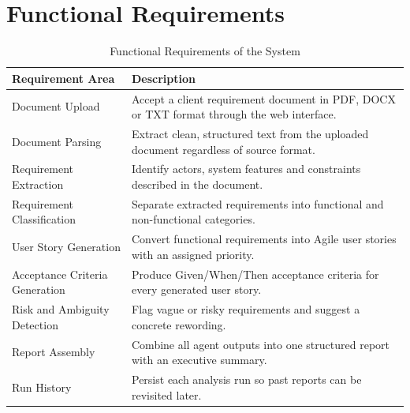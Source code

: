 \documentclass[12pt,a4paper,openany]{report}
\begin{document}
\section{Functional Requirements}
\begin{table}[H]
\centering
\caption{Functional Requirements of the System}
\label{tab:functional}
\begin{tabularx}{\textwidth}{|>{\raggedright\arraybackslash}p{3.6cm}|X|}
\hline
\textbf{Requirement Area} & \textbf{Description} \\
\hline
Document Upload & Accept a client requirement document in PDF, DOCX or TXT format through the web interface. \\
\hline
Document Parsing & Extract clean, structured text from the uploaded document regardless of source format. \\
\hline
Requirement Extraction & Identify actors, system features and constraints described in the document. \\
\hline
Requirement Classification & Separate extracted requirements into functional and non-functional categories. \\
\hline
User Story Generation & Convert functional requirements into Agile user stories with an assigned priority. \\
\hline
Acceptance Criteria Generation & Produce Given/When/Then acceptance criteria for every generated user story. \\
\hline
Risk and Ambiguity Detection & Flag vague or risky requirements and suggest a concrete rewording. \\
\hline
Report Assembly & Combine all agent outputs into one structured report with an executive summary. \\
\hline
Run History & Persist each analysis run so past reports can be revisited later. \\
\hline
\end{tabularx}
\end{table}
\end{document}
